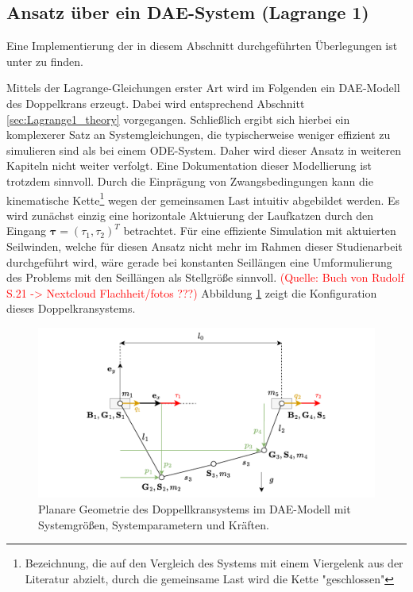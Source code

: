 \subsection{Ansatz über ein DAE-System (Lagrange 1)}
Eine Implementierung der in diesem Abschnitt durchgeführten Überlegungen ist unter \cite[double\_crane\_notebooks/DAE\_double\_crane\_cartesian.ipynb]{SAGithub} zu finden.

Mittels der Lagrange-Gleichungen erster Art wird im Folgenden ein DAE-Modell des Doppelkrans erzeugt. Dabei wird entsprechend Abschnitt \ref{sec:Lagrange1_theory} vorgegangen. Schließlich ergibt sich hierbei ein komplexerer Satz an Systemgleichungen, die typischerweise weniger effizient zu simulieren sind als bei einem ODE-System. Daher wird dieser Ansatz in weiteren Kapiteln nicht weiter verfolgt. Eine Dokumentation dieser Modellierung ist trotzdem sinnvoll. Durch die Einprägung von Zwangsbedingungen kann die kinematische Kette\footnote{Bezeichnung, die auf den Vergleich des Systems mit einem Viergelenk aus der Literatur abzielt, durch die gemeinsame Last wird die Kette "geschlossen"} wegen der gemeinsamen Last intuitiv abgebildet werden. Es wird zunächst einzig eine horizontale Aktuierung der Laufkatzen durch den Eingang $\boldsymbol{\tau} = (\tau_{1}, \tau_{2})^T$ betrachtet. Für eine effiziente Simulation mit aktuierten Seilwinden, welche für diesen Ansatz nicht mehr im Rahmen dieser Studienarbeit durchgeführt wird, wäre gerade bei konstanten Seillängen eine Umformulierung des Problems mit den Seillängen als Stellgröße sinnvoll. \textcolor{red}{(Quelle: Buch von Rudolf S.21 -> Nextcloud Flachheit/fotos ???)} Abbildung \ref{fig:DAE_double_crane_diagram} zeigt die Konfiguration dieses Doppelkransystems.

\begin{figure}[ht]
	\begin{center}
		\includegraphics[scale=1]{Pictures/DAE_double_crane_cartesian_diagram.pdf}
	\end{center}
	\caption[Planare Geometrie des Doppellkransystems im DAE-Modell]
	{Planare Geometrie des Doppellkransystems im DAE-Modell mit Systemgrößen, Systemparametern und Kräften.}
	\label{fig:DAE_double_crane_diagram}
\end{figure}

